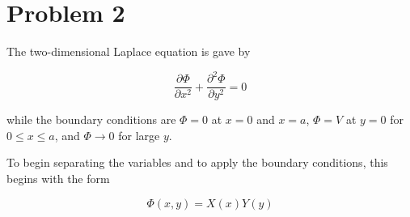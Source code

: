\documentclass[11pt]{article}
\begin{document}


\clearpage

\section*{Problem 2}

\iffalse

\begin{center}
\begin{tikzpicture}
    \fill[gray]
        (0, 0) rectangle (2, 12)
        (8, 0) rectangle (10, 12)
        (0, 0) rectangle (10, 2);

    \node[anchor = north] at (2, 2)   {\scriptsize 0};
    \node[anchor = north] at (8, 2)   {\scriptsize $a$};
    \node[anchor = north] at (10.2, 2)   {\scriptsize $x$};
    \node[anchor = north] at (2, 12.5)   {\scriptsize $y$};
    \node[anchor = south] at (5, 2.5) {\scriptsize $\Phi = V$}
    \node[anchor = south] at (2.5, 6) {\scriptsize $\Phi = 0$};
    \node[anchor = south] at (7.5, 6) {\scriptsize $\Phi = 0$};
    \node[anchor = south] at (5, 11) {\scriptsize $\Phi = 0$};
    \draw[->] (5, 11.5) to (5, 12);

    \draw[->] (2, 2) to (10, 2);
    \draw[->]  (2, 2) to (2, 12);
    \draw[->]  (8, 2) to (8, 12);
\end{tikzpicture}
\end{center}
\fi

The two-dimensional Laplace equation is gave by

$$
\frac{\partial \Phi}{\partial x^{2}} + \frac{\partial^{2}\Phi}{\partial y^{2}} = 0
$$

while the boundary conditions are $\Phi = 0$ at $x = 0$ and $x = a$, $\Phi = V$ at $y = 0$ for $0 \leq x \leq a$, and $\Phi \rightarrow 0$ for large $y$.

To begin separating the variables and to apply the boundary conditions, this begins with the form

$$
\Phi(x, y) = X(x)Y(y)
$$
\end{document}
